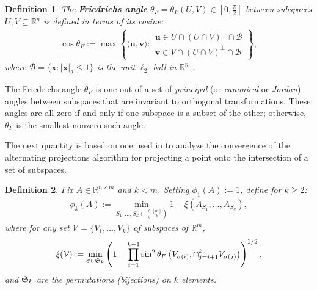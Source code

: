 \documentclass[journal, twocolumn]{IEEEtran}
\newtheorem{definition}{Definition}
\begin{document}
\begin{definition}\label{FriedrichsDefinition}
The \textbf{Friedrichs angle} $\theta_F = \theta_F(U,V) \in [0,\frac{\pi}{2}]$ between subspaces $U,V \subseteq \mathbb{R}^n$ is defined in terms of its cosine:
\begin{align*}
\cos{\theta_F} := \max\left\{ \langle \mathbf{u}, \mathbf{v} \rangle: \substack{ \mathbf{u} \in U \cap (U \cap V)^\perp \cap \mathcal{B} \\ \mathbf{v} \in V \cap (U \cap V)^\perp \cap \mathcal{B} } \right\},
\end{align*}
where $\mathcal{B} = \{ \mathbf{x}: |\mathbf{x}|_2 \leq 1\}$ is the unit $\ell_2$-ball in $\mathbb{R}^n$ \cite{Deutsch12}.
\end{definition}
The Friedrichs angle $\theta_F$ is one out of a set of \textit{principal} (or \textit{canonical} or \textit{Jordan}) angles between subspaces that are invariant to orthogonal transformations. These angles are all zero if and only if one subspace is a subset of the other; otherwise, $\theta_F$ is the smallest nonzero such angle. 

The next quantity is based on one used in \cite{Deutsch12} to analyze the convergence of the alternating projections algorithm for projecting a point onto the intersection of a set of subspaces.

\begin{definition}\label{SpecialSupportSet}
Fix $A \in \mathbb{R}^{n \times m}$ and $k < m$. Setting $\phi_1(A) := 1$, define for $k \geq 2$:
\begin{align*}
\phi_k(A) := \min_{ S_1,\ldots,S_k \in {[m] \choose k} } 1 - \xi( A_{S_1}, \ldots, A_{S_k}),
\end{align*}
where for any set $\mathcal{V} = \{V_1, \ldots, V_k\}$ of subspaces of $\mathbb{R}^m$, 
\begin{align*}
\xi(\mathcal{V}) := \min_{\sigma \in \frak{S}_k} \left(1 - \prod_{i=1}^{k-1} \sin^2  \theta_F \left(V_{\sigma(i)}, \cap_{j=i+1}^k V_{\sigma(j)} \right)  \right)^{1/2},
\end{align*}
and $\frak{S}_{k}$ are the permutations (bijections) on $k$ elements. 
\end{definition}
\end{document}
